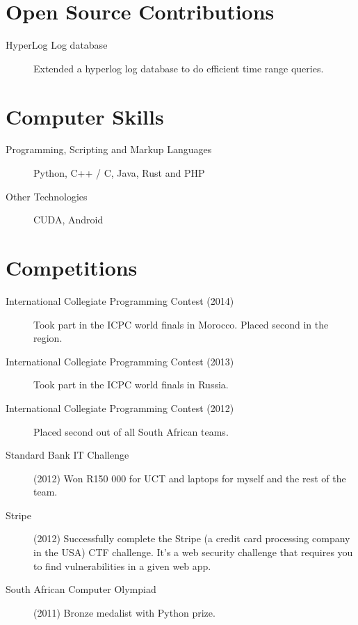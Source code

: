 \documentclass[margin,line,a4paper]{resume}
\begin{document}
\begin{resume}
        \section{\mysidestyle Open Source Contributions}
            \begin{description}
                \item[HyperLog Log database] Extended a hyperlog log database to do efficient time range queries.
            \end{description}

        \section{\mysidestyle Computer Skills}
            \begin{description}
                \item [Programming, Scripting and Markup Languages] Python, C++ / C, Java, Rust and PHP
                \item [Other Technologies] CUDA, Android
            \end{description}

        \section{\mysidestyle Competitions}
            \begin{description}
                \item [International Collegiate Programming Contest (2014)] Took part in the ICPC world finals in Morocco. Placed second in the region.
                \item [International Collegiate Programming Contest (2013)] Took part in the ICPC world finals in Russia.
                \item [International Collegiate Programming Contest (2012)] Placed second out of all South African teams.
                \item [Standard Bank IT Challenge] (2012) Won R150 000 for UCT and laptops for myself and the rest of the team.
                \item [Stripe] (2012) Successfully complete the Stripe (a credit card processing company in the USA) CTF challenge. 
                    It's a web security challenge that requires you to find vulnerabilities in a given web app.

                \item [South African Computer Olympiad] (2011) Bronze medalist with Python prize.


\end{description}
\end{resume}
\end{document}
